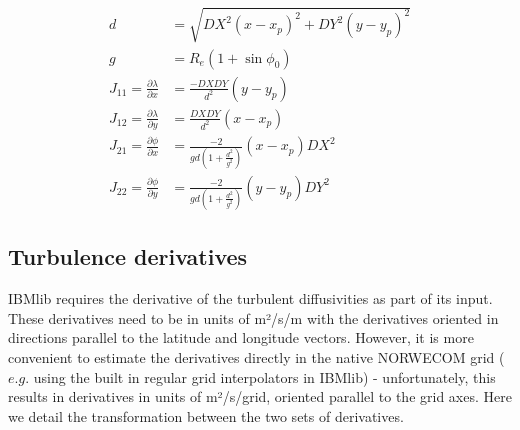 \documentclass[a4paper,10pt]{article}
\begin{document}
\begin{subequations}\begin{align}
d &= \sqrt{{DX}^2{\left(x-x_p\right)}^2 + {DY}^2{\left(y-y_p\right)}^2}\\
g &= R_e\left(1+\sin\phi_0\right) \\
J_{11} = \frac {\partial \lambda}{\partial x} 
       &= \frac{-DXDY}{d^2}\left(y-y_p\right)\\
J_{12} = \frac {\partial \lambda}{\partial y}
       &= \frac{DXDY}{d^2}\left(x-x_p\right)\\
J_{21} = \frac {\partial \phi}  {\partial x}
       &= \frac{-2}{gd\left(1+\frac{d^2}{g^2}\right)} \left(x-x_p\right){DX}^2\\
J_{22} =  \frac {\partial \phi}{\partial y}
       &= \frac{-2}{gd\left(1+\frac{d^2}{g^2}\right)} \left(y-y_p\right){DY}^2
\end{align}\end{subequations}

\subsection{Turbulence derivatives}
IBMlib requires the derivative of the turbulent diffusivities as part of its input. These derivatives need to be in units of m²/s/m with the derivatives oriented in directions parallel to the latitude and longitude vectors. However, it is more convenient to estimate the derivatives directly in the native NORWECOM grid ($e.g.$ using the built in regular grid interpolators in IBMlib) - unfortunately, this results in derivatives in units of m²/s/grid, oriented parallel to the grid axes. Here we detail the transformation between the two sets of derivatives.
\end{document}
